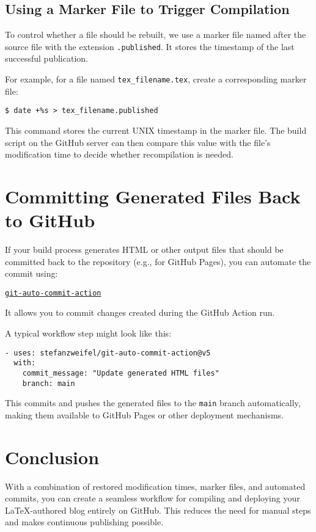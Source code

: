 \documentclass{article}
\begin{document}
\subsection{Using a Marker File to Trigger Compilation}

To control whether a file should be rebuilt, we use a marker file named after the source file 
with the extension \texttt{.published}. It stores the timestamp of the last successful publication.

For example, for a file named \texttt{tex\_filename.tex}, create a corresponding marker file:

\begin{verbatim}
$ date +%s > tex_filename.published
\end{verbatim}

This command stores the current UNIX timestamp in the marker file. The build script 
on the GitHub server can then compare this value with the file's modification time 
to decide whether recompilation is needed.

\section{Committing Generated Files Back to GitHub}

If your build process generates HTML or other output files that should be committed 
back to the repository (e.g., for GitHub Pages), you can automate the commit using:

\href{https://github.com/stefanzweifel/git-auto-commit-action}{\texttt{git-auto-commit-action}}

It allows you to commit changes created during the GitHub Action run.

A typical workflow step might look like this:

\begin{verbatim}
- uses: stefanzweifel/git-auto-commit-action@v5
  with:
    commit_message: "Update generated HTML files"
    branch: main
\end{verbatim}

This commits and pushes the generated files to the \texttt{main} branch automatically, 
making them available to GitHub Pages or other deployment mechanisms.

\section{Conclusion}

With a combination of restored modification times, marker files, and automated commits, 
you can create a seamless workflow for compiling and deploying your \LaTeX{}-authored blog 
entirely on GitHub. This reduces the need for manual steps and makes continuous publishing possible.
\end{document}
